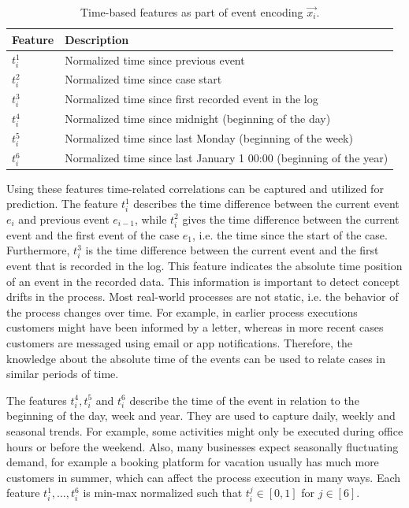 \begin{table}[!htbp]
	\centering
	\begin{tabularx}{\textwidth}{l l}
		\toprule
		 \textbf{Feature} & \textbf{Description} \\
		 \midrule
		$t_i^1$ & Normalized time since previous event \\
		$t_i^2$ & Normalized time since case start\\
		$t_i^3$ & Normalized time since first recorded event in the log\\
		$t_i^4$ & Normalized time since midnight (beginning of the day)\\
		$t_i^5$ & Normalized time since last Monday (beginning of the week)\\
		$t_i^6$ & Normalized time since last January 1 00:00 (beginning of the year)\\
		\bottomrule
	\end{tabularx}
	\caption[Time-based features as part of the event encoding]{Time-based features as part of event encoding $\vec{x_i}$.}
	\label{tab:time-features}
\end{table}

Using these features time-related correlations can be captured and utilized for prediction.
The feature $t_i^1$ describes the time difference between the current event $e_i$ and previous event $e_{i-1}$, while $t_i^2$ gives the time difference between the current event and the first event of the case $e_1$, i.e. the time since the start of the case.
Furthermore, $t_i^3$ is the time difference between the current event and the first event that is recorded in the log. This feature indicates the absolute time position of an event in the recorded data.
This information is important to detect concept drifts \cite{DBLP:journals/tnn/BoseAZP14} in the process.
Most real-world processes are not static, i.e. the behavior of the process changes over time.
For example, in earlier process executions customers might have been informed by a letter, whereas in more recent cases customers are messaged using email or app notifications.
Therefore, the knowledge about the absolute time of the events can be used to relate cases in similar periods of time.

The features $t_i^4, t_i^5$ and $t_i^6$ describe the time of the event in relation to the beginning of the day, week and year.
They are used to capture daily, weekly and seasonal trends.
For example, some activities might only be executed during office hours or before the weekend.
Also, many businesses expect seasonally fluctuating demand, for example a booking platform for vacation usually has much more customers in summer, which can affect the process execution in many ways.
Each feature $t_i^1, \dots, t_i^6$ is min-max normalized such that $t_i^j \in [0,1]$ for $j \in [6]$.

